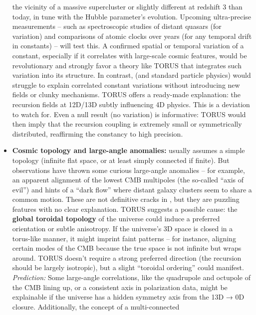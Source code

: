 \documentclass[
]{article}
\begin{document}
\begin{itemize}
  the vicinity of a massive supercluster or slightly different at
  redshift 3 than today, in tune with the Hubble parameter's evolution.
  Upcoming ultra-precise measurements -- such as spectroscopic studies
  of distant quasars (for \alpha variation) and comparisons of atomic clocks
  over years (for any temporal drift in constants) -- will test
  this\hspace{0pt}. A confirmed spatial or temporal variation of a
  constant, especially if it correlates with large-scale cosmic
  features, would be revolutionary and strongly favor a theory like
  TORUS that integrates such variation into its structure. In contrast,
  \LambdaCDM (and standard particle physics) would struggle to explain
  correlated constant variations without introducing new fields or
  clunky mechanisms. TORUS offers a ready-made explanation: the
  recursion fields at 12D/13D subtly influencing 4D physics\hspace{0pt}.
  This is a deviation to watch for. Even a null result (no variation) is
  informative: TORUS would then imply that the recursion coupling is
  extremely small or symmetrically distributed, reaffirming the
  constancy to high precision.
\item
  \textbf{Cosmic topology and large-angle anomalies:} \LambdaCDM usually
  assumes a simple topology (infinite flat space, or at least simply
  connected if finite). But observations have thrown some curious
  large-angle anomalies -- for example, an apparent alignment of the
  lowest CMB multipoles (the so-called ``axis of evil'') and hints of a
  ``dark flow'' where distant galaxy clusters seem to share a common
  motion. These are not definitive cracks in \LambdaCDM, but they are puzzling
  features with no clear explanation. TORUS suggests a possible cause:
  the \textbf{global toroidal topology} of the universe could induce a
  preferred orientation or subtle anisotropy. If the universe's 3D space
  is closed in a torus-like manner, it might imprint faint patterns --
  for instance, aligning certain modes of the CMB because the true space
  is not infinite but wraps around. TORUS doesn't require a strong
  preferred direction (the recursion should be largely isotropic), but a
  slight ``toroidal ordering'' could manifest. \emph{Prediction:} Some
  large-angle correlations, like the quadrupole and octupole of the CMB
  lining up, or a consistent axis in polarization data, might be
  explainable if the universe has a hidden symmetry axis from the 13D →
  0D closure\hspace{0pt}. Additionally, the concept of a multi-connected

\end{itemize}
\end{document}
